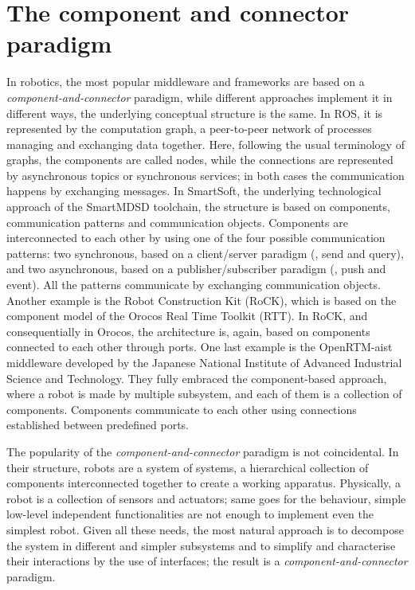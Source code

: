 \minitoc
\newpage

\section[The component and connector paradigm]{The component and connector \\paradigm}
\label{sec:cnc}
In robotics, the most popular middleware and frameworks are based on a \textit{component-and-connector} paradigm, while different approaches implement it in different ways, the underlying conceptual structure is the same. In ROS, it is represented by the computation graph, a peer-to-peer network of processes managing and exchanging data together. Here, following the usual terminology of graphs, the components are called nodes, while the connections are represented by asynchronous topics or synchronous services; in both cases the communication happens by exchanging messages. In SmartSoft, the underlying technological approach of the SmartMDSD toolchain, the structure is based on components, communication patterns and communication objects. Components are interconnected to each other by using one of the four possible communication patterns: two synchronous, based on a client/server paradigm (\ie, send and query), and two asynchronous, based on a publisher/subscriber paradigm (\ie, push and event). All the patterns communicate by exchanging communication objects. Another example is the Robot Construction Kit (RoCK), which is based on the component model of the Orocos Real Time Toolkit (RTT). In RoCK, and consequentially in Orocos, the architecture is, again, based on components connected to each other through ports. One last example is the OpenRTM-aist middleware developed by the Japanese National Institute of Advanced Industrial Science and Technology. They fully embraced the component-based approach, where a robot is made by multiple subsystem, and each of them is a collection of components. Components communicate to each other using connections established between predefined ports.

The popularity of the \textit{component-and-connector} paradigm is not coincidental. In their structure, robots are a system of systems, a hierarchical collection of components interconnected together to create a working apparatus. Physically, a robot is a collection of sensors and actuators; same goes for the behaviour, simple low-level independent functionalities are not enough to implement even the simplest robot. Given all these needs, the most natural approach is to decompose the system in different and simpler subsystems and to simplify and characterise their interactions by the use of interfaces; the result is a \textit{component-and-connector} paradigm. 

